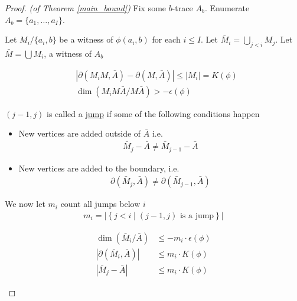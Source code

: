 \documentclass{amsart}
\newcommand{\defn}{\underline}
\newcommand{\curly}[1]{\left\{#1\right\}}
\newcommand{\abs}[1]{\left|#1\right|}
\begin{document}
\begin{proof} \textit{(of Theorem \ref{main_bound})}
  Fix some $b$-trace $A_b$. Enumerate $A_b = \{a_1, \ldots, a_I\}$.

  Let $M_i / \{a_i, b\}$ be a witness of $\phi(a_i, b)$ for each $i \leq I$.
  Let $\bar M_i = \bigcup_{j < i} M_j$.
  Let $\bar M = \bigcup M_i$, a witness of $A_b$
  
  \begin{Claim}
    \begin{align*}
      &\abs{\partial(M_i M, \bar A) - \partial(M, \bar A)} \leq |M_i| = K(\phi)\\
      &\dim(M_i M \bar A / M \bar A) > -\epsilon(\phi)
    \end{align*}
  \end{Claim}
  
  \begin{Definition}
    $(j-1, j)$ is called a \defn{jump} if some of the following conditions happen
    \begin{itemize}
    \item New vertices are added outside of $\bar A$ i.e.
      \begin{align*}
        \bar M_j - \bar A \neq \bar M_{j-1} - \bar A
      \end{align*}
    \item New vertices are added to the boundary, i.e.
      \begin{align*}
        \partial(\bar M_j, \bar A) \neq \partial(\bar M_{j-1}, \bar A)
      \end{align*}
    \end{itemize}
  \end{Definition}

  \begin{Definition}
    We now let $m_i$ count all jumps below $i$
    \begin{align*}
      m_i = \abs{\curly{j < i \mid (j-1, j) \text{ is a jump}}}
    \end{align*}
  \end{Definition}

  \begin{Lemma} \label{ub_lemma}
    \begin{align*}
      \dim(\bar M_i / \bar A) &\leq -m_i \cdot \epsilon(\phi) \\
      |\partial(\bar M_i, \bar A)| &\leq m_i \cdot K(\phi) \\
      |\bar M_j - \bar A| &\leq m_i \cdot K(\phi)
    \end{align*}
  \end{Lemma}


\end{proof}
\end{document}
